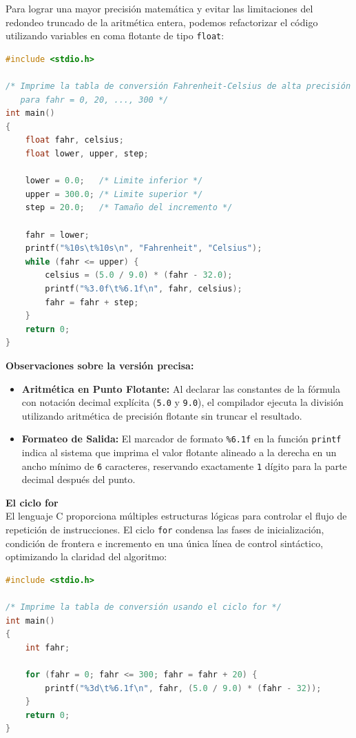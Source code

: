 \documentclass[11pt, a4paper]{article}
\begin{document}
Para lograr una mayor precisión matemática y evitar las limitaciones del redondeo truncado de la aritmética entera, podemos refactorizar el código utilizando variables en coma flotante de tipo \texttt{float}:

\begin{lstlisting}[language=C, caption={Programa de conversión Fahrenheit-Celsius de alta precisión}, path={/Ejercicios/fahrenheit-celsius-precise/f-to-c.c}]
#include <stdio.h>

/* Imprime la tabla de conversión Fahrenheit-Celsius de alta precisión
   para fahr = 0, 20, ..., 300 */
int main()
{
    float fahr, celsius;
    float lower, upper, step;

    lower = 0.0;   /* Limite inferior */
    upper = 300.0; /* Limite superior */
    step = 20.0;   /* Tamaño del incremento */

    fahr = lower;
    printf("%10s\t%10s\n", "Fahrenheit", "Celsius");
    while (fahr <= upper) {
        celsius = (5.0 / 9.0) * (fahr - 32.0);
        printf("%3.0f\t%6.1f\n", fahr, celsius);
        fahr = fahr + step;
    }
    return 0;
}
\end{lstlisting}

\noindent\textbf{Observaciones sobre la versión precisa:}
\begin{itemize}
  \item \textbf{Aritmética en Punto Flotante:} Al declarar las constantes de la fórmula con notación decimal explícita (\texttt{5.0} y \texttt{9.0}), el compilador ejecuta la división utilizando aritmética de precisión flotante sin truncar el resultado.
  \item \textbf{Formateo de Salida:} El marcador de formato \texttt{\%6.1f} en la función \texttt{printf} indica al sistema que imprima el valor flotante alineado a la derecha en un ancho mínimo de \texttt{6} caracteres, reservando exactamente \texttt{1} dígito para la parte decimal después del punto.
\end{itemize}

\noindent\textbf{El ciclo for}\\[0.5em]
El lenguaje C proporciona múltiples estructuras lógicas para controlar el flujo de repetición de instrucciones. El ciclo \texttt{for} condensa las fases de inicialización, condición de frontera e incremento en una única línea de control sintáctico, optimizando la claridad del algoritmo:

\begin{lstlisting}[language=C, caption={Programa Fahrenheit-Celsius structured con ciclo for}, path={/Ejercicios/fahrenheit-celsius-for/f-to-c.c}]
#include <stdio.h>

/* Imprime la tabla de conversión usando el ciclo for */
int main()
{
    int fahr;

    for (fahr = 0; fahr <= 300; fahr = fahr + 20) {
        printf("%3d\t%6.1f\n", fahr, (5.0 / 9.0) * (fahr - 32));
    }
    return 0;
}
\end{lstlisting}
\end{document}
